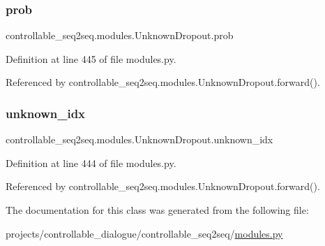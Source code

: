 \subsubsection{\texorpdfstring{prob}{prob}}
{\footnotesize\ttfamily controllable\+\_\+seq2seq.\+modules.\+Unknown\+Dropout.\+prob}



Definition at line 445 of file modules.\+py.



Referenced by controllable\+\_\+seq2seq.\+modules.\+Unknown\+Dropout.\+forward().

\mbox{\label{classcontrollable__seq2seq_1_1modules_1_1UnknownDropout_a89674ff3d4854744a0f2671e474a42a2}} 
\subsubsection{\texorpdfstring{unknown\+\_\+idx}{unknown\_idx}}
{\footnotesize\ttfamily controllable\+\_\+seq2seq.\+modules.\+Unknown\+Dropout.\+unknown\+\_\+idx}



Definition at line 444 of file modules.\+py.



Referenced by controllable\+\_\+seq2seq.\+modules.\+Unknown\+Dropout.\+forward().



The documentation for this class was generated from the following file\+:\begin{DoxyCompactItemize}
\item 
projects/controllable\+\_\+dialogue/controllable\+\_\+seq2seq/\hyperlink{projects_2controllable__dialogue_2controllable__seq2seq_2modules_8py}{modules.\+py}\end{DoxyCompactItemize}

